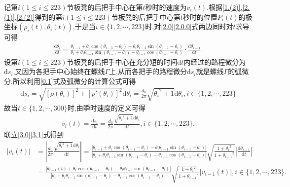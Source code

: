 \documentclass[lang=cn,newtx,10pt,scheme=chinese]{../Template/elegantbook}
\begin{document}
记第\(i(1\leqslant i\leqslant 223)\)节板凳的后把手中心在第\(t\)秒时的速度为\(v_i(t)\).根据\eqref{1.(2)},\eqref{2.(1)},\eqref{2.(2)}得到的第\(i(1\leqslant i\leqslant 223)\)节板凳的后把手中心第\(t\)秒时的位置\(P_{i}(t)\)的极坐标\((\rho _{i}(t),\theta _{i}(t))\),于是当\(i\in \{ 1,2,\cdots ,223 \}\)时,对\eqref{2.0}\eqref{2.0.0}式两边同时对\(t\)求导可得
\begin{align}
\frac{\mathrm{d}\theta _i}{\mathrm{d}t}=\frac{\theta _{i - 1}+\theta _i\cos(\theta _{i - 1}-\theta _i)-\theta _i\theta _{i - 1}\sin(\theta _{i - 1}-\theta _i)}{\theta _i+\theta _i\theta _{i - 1}\sin(\theta _{i - 1}-\theta _i)-\theta _{i - 1}\cos(\theta _{i - 1}-\theta _i)}\cdot \frac{\mathrm{d}\theta _{i - 1}}{\mathrm{d}t}.\label{3.0}
\end{align}
设第\(i(1\leqslant i\leqslant 223)\)节板凳的后把手中心在充分短的时间\(\mathrm{d}t\)内经过的路程微分为\(\mathrm{d}s_i\),又因为各把手中心始终在螺线\(\varGamma\)上,从而各把手的路程微分\(\mathrm{d}s_i\)就是螺线\(\varGamma\)的弧微分,所以利用\eqref{0.1}式及弧微分的计算公式可得
\begin{align}
\mathrm{d}s_i=\sqrt{[\rho (\theta _i)]^2+[\rho \prime (\theta _i)]^2}\mathrm{d}\theta _i=\frac{d_0}{2\pi}\sqrt{{\theta _i}^2+1}\mathrm{d}\theta _i,i\in \{ 1,2,\cdots ,223 \}  
\end{align}
故当\(t\in \{ 1,2,\cdots ,300 \}\)时,由瞬时速度的定义可得
\begin{align}
v_i(t) =\frac{\mathrm{d}s_i}{\mathrm{d}t}=\frac{d_0}{2\pi}\frac{\sqrt{{\theta _i}^2 + 1}\mathrm{d}\theta _i}{\mathrm{d}t}, i\in \{1, 2, \cdots, 223\}. \label{3.1}
\end{align}
联立\eqref{3.0}\eqref{3.1}式得到
\begin{align}
|v_i(t)| &= \left|\frac{d_0}{2\pi}\frac{\sqrt{{\theta _i}^2 + 1}\mathrm{d}\theta _i}{\mathrm{d}t}\right| 
= \frac{|\theta _{i - 1} + \theta _i\cos(\theta _{i - 1} - \theta _i) - \theta _i\theta _{i - 1}\sin(\theta _{i - 1} - \theta _i)|}{|\theta _i + \theta _i\theta _{i - 1}\sin(\theta _{i - 1} - \theta _i) - \theta _{i - 1}\cos(\theta _{i - 1} - \theta _i)|}\sqrt{\frac{1 + {\theta _i}^2}{1 + {\theta _{i - 1}}^2}}\left|\frac{\mathrm{d}\theta _{i - 1}}{\mathrm{d}t}\right| \\
&= \frac{|\theta _{i - 1}(t) + \theta _i\cos(\theta _{i - 1} - \theta _i) - \theta _i\theta _{i - 1}\sin(\theta _{i - 1} - \theta _i)|}{|\theta _i + \theta _i\theta _{i - 1}\sin(\theta _{i - 1} - \theta _i) - \theta _{i - 1}\cos(\theta _{i - 1} - \theta _i)|}\sqrt{\frac{1 + {\theta _i}^2}{1 + {\theta _{i - 1}}^2}}|v_{i - 1}(t)|, i\in \{1, 2, \cdots, 223\}.
\end{align}
\end{document}
